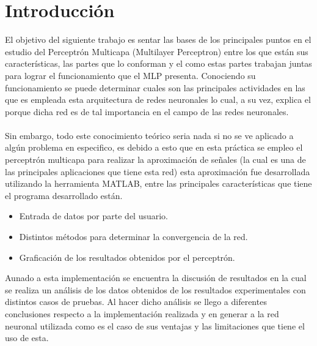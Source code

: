 \section{Introducción}
El objetivo del siguiente trabajo es sentar las bases de los principales puntos 
en el estudio del Perceptrón Multicapa (Multilayer Perceptron) entre los que 
están sus características, las partes que lo conforman y el como estas partes 
trabajan juntas para lograr el funcionamiento que el MLP presenta. Conociendo 
su funcionamiento se puede determinar cuales son las principales actividades en 
las que es empleada esta arquitectura de redes neuronales lo cual, a su vez, 
explica el porque dicha red es de tal importancia en el campo de las redes 
neuronales.
\\\\
Sin embargo, todo este conocimiento teórico seria nada si no se ve aplicado a 
algún problema en especifico, es debido a esto que en esta práctica se empleo 
el perceptrón multicapa para realizar la aproximación de señales (la cual es 
una de las principales aplicaciones que tiene esta red) esta aproximación fue 
desarrollada utilizando la herramienta MATLAB, entre las principales 
características que tiene el programa desarrollado están.
\begin{itemize}
 \item Entrada de datos por parte del usuario.
 \item Distintos métodos para determinar la convergencia de la red.
 \item Graficación de los resultados obtenidos por el perceptrón.
\end{itemize}
Aunado a esta implementación se encuentra la discusión de resultados en la cual 
se realiza un análisis de los datos obtenidos de los resultados 
experimentales con distintos casos de pruebas. Al hacer dicho análisis se llego 
a diferentes conclusiones respecto a la implementación realizada y en generar a 
la red neuronal utilizada como es el caso de sus ventajas y las limitaciones 
que tiene el uso de esta.